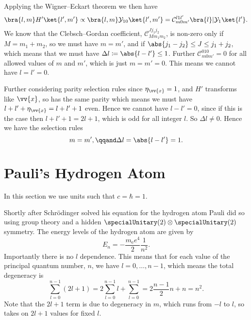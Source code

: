 \documentclass[fleqn]{NotesClass}
\newcommand*{\directproduct}{\otimes}
\newcommand*{\clebschgordan}[6]{\mathcal{C}_{#1#2#3}^{#4#5#6}}
\begin{document}
    Applying the Wigner--Eckart theorem we then have
    \begin{equation}
        \bra{l,m} H' \ket{l',m'} \propto \bra{l,m}\mathcal{Y}_{10}\ket{l',m'} = \clebschgordan{m}{0}{m'}{l}{1}{l'} \bra{l} |\mathcal{Y}_1 \ket{l'}.
    \end{equation}
    We know that the Clebsch--Gordan coefficient, \(\clebschgordan{M}{m_1}{m_2}{J}{j_1}{j_2}\), is non-zero only if \(M = m_1 + m_2\), so we must have \(m = m'\), and if \(\abs{j_1 - j_2} \le J \le j_1 + j_2\), which means that we must have \(\Delta l \coloneqq \abs{l - l'} \le 1\).
    Further \(\clebschgordan{m}{0}{m'}{0}{1}{0} = 0\) for all allowed values of \(m\) and \(m'\), which is just \(m = m' = 0\).
    This means we cannot have \(l = l' = 0\).
    
    Further considering parity selection rules since \(\eta_{\vv{x}} = 1\), and \(H'\) transforms like \(\vv{x}\), so has the same parity which means we must have \(l + l' + \eta_{\vv{x}} = l + l' + 1\) even.
    Hence we cannot have \(l - l' = 0\), since if this is the case then \(l + l' + 1 = 2l + 1\), which is odd for all integer \(l\).
    So \(\Delta l \ne 0\).
    Hence we have the selection rules
    \begin{equation}
        m = m', \qqand \Delta l = \abs{l - l'} = 1.
    \end{equation}
    
    \section{Pauli's Hydrogen Atom}
    \begin{wrn}
        In this section we use units such that \(c = \hbar = 1\).
    \end{wrn}
    Shortly after Schrödinger solved his equation for the hydrogen atom Pauli did so using group theory and a hidden \(\specialUnitary(2) \directproduct \specialUnitary(2)\) symmetry.
    The energy levels of the hydrogen atom are given by
    \begin{equation}
        E_n = -\frac{m_{\mathrm{e}}e^4}{2} \frac{1}{n^2}.
    \end{equation}
    Importantly there is no \(l\) dependence.
    This means that for each value of the principal quantum number, \(n\), we have \(l = 0, \dotsc, n - 1\), which means the total degeneracy is
    \begin{equation}
        \sum_{l = 0}^{n - 1} (2l + 1) = 2\sum_{l = 0}^{n - 1}l + \sum_{l = 0}^{n - 1} = 2\frac{n - 1}{2}n + n = n^2.
    \end{equation}
    Note that the \(2l + 1\) term is due to degeneracy in \(m\), which runs from \(-l\) to \(l\), so takes on \(2l + 1\) values for fixed \(l\).
    
\end{document}
